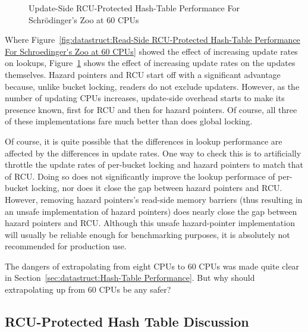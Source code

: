 \begin{figure}[tb]
\centering
{}
\caption{Update-Side RCU-Protected Hash-Table Performance For Schr\"odinger's Zoo at 60 CPUs}
\label{fig:datastruct:Update-Side RCU-Protected Hash-Table Performance For Schroedinger's Zoo at 60 CPUs}
\end{figure}

Where
Figure~\ref{fig:datastruct:Read-Side RCU-Protected Hash-Table Performance For Schroedinger's Zoo at 60 CPUs}
showed the effect of increasing update rates on lookups,
Figure~\ref{fig:datastruct:Update-Side RCU-Protected Hash-Table Performance For Schroedinger's Zoo at 60 CPUs}
shows the effect of increasing update rates on the updates themselves.
Hazard pointers and RCU start off with a significant advantage because,
unlike bucket locking, readers do not exclude updaters.
However, as the number of updating CPUs increases, update-side overhead
starts to make its presence known, first for RCU and then for hazard
pointers.
Of course, all three of these implementations fare much better than does
global locking.

Of course, it is quite possible that the differences in lookup performance
are affected by the differences in update rates.
One way to check this is to artificially throttle the update rates of
per-bucket locking and hazard pointers to match that of RCU.
Doing so does not significantly improve the lookup performace of
per-bucket locking, nor does it close the gap between hazard pointers
and RCU.
However, removing hazard pointers's read-side memory barriers
(thus resulting in an unsafe implementation of hazard pointers)
does nearly close the gap between hazard pointers and RCU.
Although this unsafe hazard-pointer implementation will
usually be reliable enough for benchmarking purposes, it is absolutely
not recommended for production use.

\QuickQuiz{}
	The dangers of extrapolating from eight CPUs to 60 CPUs was
	made quite clear in
	Section~\ref{sec:datastruct:Hash-Table Performance}.
	But why should extrapolating up from 60 CPUs be any safer?
 \QuickQuizEnd

\subsection{RCU-Protected Hash Table Discussion}
\label{sec:datastruct:RCU-Protected Hash Table Discussion}

